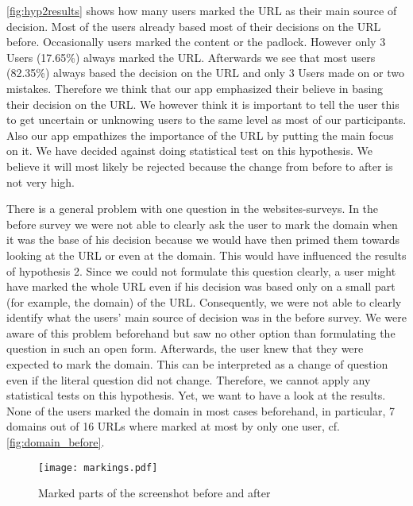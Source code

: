 \begin{description}[leftmargin=0cm]
\item[Hypothesis 2:]
\autoref{fig:hyp2results} shows how many users marked the URL as their main source of decision.
Most of the users already based most of their decisions on the URL before.
Occasionally users marked the content or the padlock.
However only 3 Users (17.65\%) always marked the URL.
Afterwards we see that most users (82.35\%) always based the decision on the URL and only 3 Users made on or two mistakes.
Therefore we think that our app emphasized their believe in basing their decision on the URL.
We however think it is important to tell the user this to get uncertain or unknowing users to the same level as most of our participants.
Also our app empathizes the importance of the URL by putting the main focus on it.
We have decided against doing statistical test on this hypothesis.
We believe it will most likely be rejected because the change from before to after is not very high.
\item[Hypothesis 3:]
There is a general problem with one question in the websites-surveys.
In the before survey we were not able to clearly ask the user to mark the domain when it was the base of his decision because we would have then primed them towards looking at the URL or even at the domain.
This would have influenced the results of hypothesis 2.
Since we could not formulate this question clearly, a user might have marked the whole URL even if his decision was based only on a small part (for example, the domain) of the URL.
Consequently, we were not able to clearly identify what the users' main source of decision was in the before survey.
We were aware of this problem beforehand but saw no other option than formulating the question in such an open form.
Afterwards, the user knew that they were expected to mark the domain.
This can be interpreted as a change of question even if the literal question did not change.
Therefore, we cannot apply any statistical tests on this hypothesis.
Yet, we want to have a look at the results.
None of the users marked the domain in most cases beforehand, in particular, 7 domains out of 16 URLs where marked at most by only one user, cf. \autoref{fig:domain_before}.
\begin{figure}
\centering
\texttt{[image: markings.pdf]}
\caption{Marked parts of the screenshot before and after}
\label{fig:markings}
\end{figure}


\end{description}
